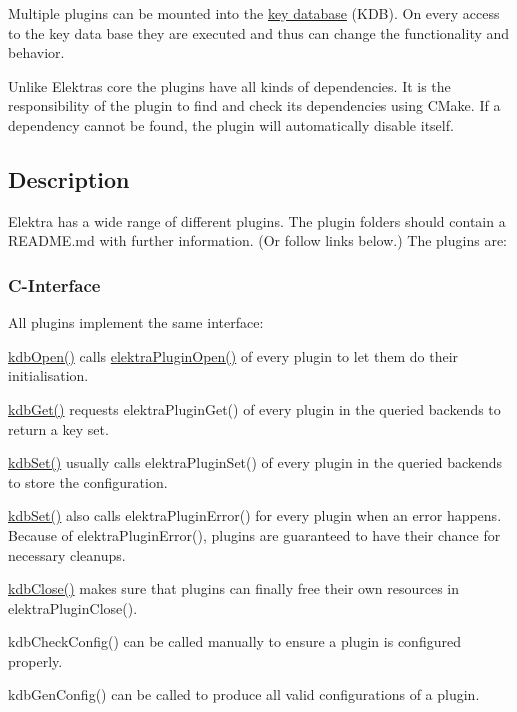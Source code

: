 Multiple plugins can be mounted into the \hyperlink{doc_help_elektra-glossary_md}{key database} (K\+DB). On every access to the key data base they are executed and thus can change the functionality and behavior.

Unlike Elektra\textquotesingle{}s core the plugins have all kinds of dependencies. It is the responsibility of the plugin to find and check its dependencies using C\+Make. If a dependency cannot be found, the plugin will automatically disable itself.

\subsection*{Description}

Elektra has a wide range of different plugins. The plugin folders should contain a R\+E\+A\+D\+M\+E.\+md with further information. (Or follow links below.) The plugins are\+:

 \subsubsection*{C-\/\+Interface}

All plugins implement the same interface\+:


\begin{DoxyItemize}
\item {\ttfamily \hyperlink{group__kdb_ga6808defe5870f328dd17910aacbdc6ca}{kdb\+Open()}} calls {\ttfamily \hyperlink{elektra_2plugin_8c_a32a70a7876542c51d153164ac5108a57}{elektra\+Plugin\+Open()}} of every plugin to let them do their initialisation.
\item {\ttfamily \hyperlink{group__kdb_ga28e385fd9cb7ccfe0b2f1ed2f62453a1}{kdb\+Get()}} requests {\ttfamily elektra\+Plugin\+Get()} of every plugin in the queried backends to return a key set.
\item {\ttfamily \hyperlink{group__kdb_ga11436b058408f83d303ca5e996832bcf}{kdb\+Set()}} usually calls {\ttfamily elektra\+Plugin\+Set()} of every plugin in the queried backends to store the configuration.
\item {\ttfamily \hyperlink{group__kdb_ga11436b058408f83d303ca5e996832bcf}{kdb\+Set()}} also calls {\ttfamily elektra\+Plugin\+Error()} for every plugin when an error happens. Because of {\ttfamily elektra\+Plugin\+Error()}, plugins are guaranteed to have their chance for necessary cleanups.
\item {\ttfamily \hyperlink{group__kdb_gadb54dc9fda17ee07deb9444df745c96f}{kdb\+Close()}} makes sure that plugins can finally free their own resources in {\ttfamily elektra\+Plugin\+Close()}.
\item {\ttfamily kdb\+Check\+Config()} can be called manually to ensure a plugin is configured properly.
\item {\ttfamily kdb\+Gen\+Config()} can be called to produce all valid configurations of a plugin.
\end{DoxyItemize}

